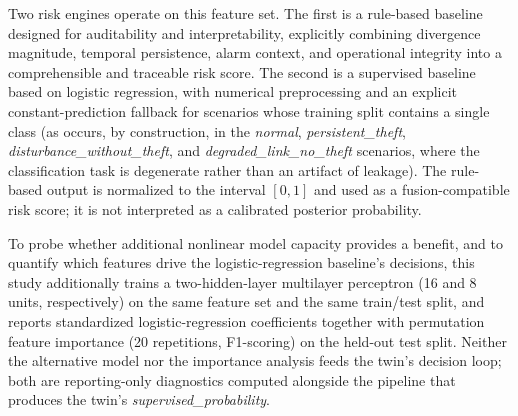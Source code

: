 \documentclass{ieeeaccess}
\begin{document}
Two risk engines operate on this feature set. The first is a rule-based baseline designed for auditability and interpretability, explicitly combining divergence magnitude, temporal persistence, alarm context, and operational integrity into a comprehensible and traceable risk score. The second is a supervised baseline based on logistic regression, with numerical preprocessing and an explicit constant-prediction fallback for scenarios whose training split contains a single class (as occurs, by construction, in the \textit{normal}, \textit{persistent\_theft}, \textit{disturbance\_without\_theft}, and \textit{degraded\_link\_no\_theft} scenarios, where the classification task is degenerate rather than an artifact of leakage). The rule-based output is normalized to the interval $[0,1]$ and used as a fusion-compatible risk score; it is not interpreted as a calibrated posterior probability.

To probe whether additional nonlinear model capacity provides a benefit, and to quantify which features drive the logistic-regression baseline's decisions, this study additionally trains a two-hidden-layer multilayer perceptron (16 and 8 units, respectively) on the same feature set and the same train/test split, and reports standardized logistic-regression coefficients together with permutation feature importance (20 repetitions, F1-scoring) on the held-out test split. Neither the alternative model nor the importance analysis feeds the twin's decision loop; both are reporting-only diagnostics computed alongside the pipeline that produces the twin's \textit{supervised\_probability}.
\end{document}
